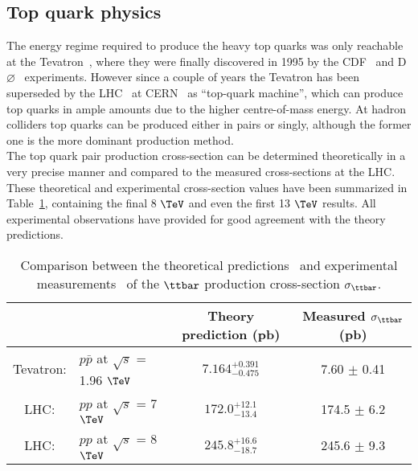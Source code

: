 \subsection{Top quark physics}
The energy regime required to produce the heavy top quarks was only reachable at the Tevatron~\cite{Tevatron}, where they were finally discovered in 1995 by the CDF~\cite{CDF} and D$\varnothing$~\cite{D0} experiments. However since a couple of years the Tevatron has been superseded by the LHC~\cite{} at CERN~\cite{CERN} as ``top-quark machine'', which can produce top quarks in ample amounts due to the higher centre-of-mass energy. %
At hadron colliders top quarks can be produced either in pairs or singly, although the former one is the more dominant production method.
\\
The top quark pair production cross-section can be determined theoretically in a very precise manner and compared to the measured cross-sections at the LHC. These theoretical and experimental cross-section values have been summarized in Table~\ref{table::XSTopPair}, containing the final 8 $\TeV$ and even the first 13 $\TeV$ results. 
All experimental observations have provided for good agreement with the theory predictions.
\begin{table}[h!t]
 \centering
 \caption{Comparison between the theoretical predictions~\cite{CzakonTopPairXS, CzakonGluonPDF} and experimental measurements~\cite{TevatronTTbarXS, CMSTTbarXS} of the $\ttbar$ production cross-section $\sigma_{\ttbar}$.} \label{table::XSTopPair}
 \begin{tabular}{|cl|c|c|}
  \hline
		&						& Theory prediction (pb) 	& Measured $\sigma_{\ttbar}$ (pb) 	\\
  \hline						
  Tevatron: 	& $p\bar{p}$ at $\sqrt{s}$ = 1.96 $\TeV$ 	& $7.164^{+0.391}_{-0.475}$	& 7.60 $\pm$ 0.41			\\
  LHC: 		& $pp$ at $\sqrt{s}$ = 7 $\TeV$ 		& $172.0^{+12.1}_{-13.4}$	& 174.5 $\pm$ 6.2			\\
  LHC: 		& $pp$ at $\sqrt{s}$ = 8 $\TeV$ 		& $245.8^{+16.6}_{-18.7}$	& 245.6 $\pm$ 9.3			\\
  \hline
 \end{tabular}
\end{table}

